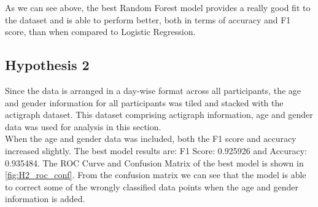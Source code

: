 \documentclass[11pt,a4paper]{article}
\newcommand{\noi}{\noindent}
\begin{document}
\noi
As we can see above, the best Random Forest model provides a really good fit to the dataset and is able to perform better, both in terms of accuracy and F1 score, than when compared to Logistic Regression.

\subsection{Hypothesis 2}
Since the data is arranged in a day-wise format across all participants, the age and gender information for all participants was tiled and stacked with the actigraph dataset. This dataset comprising actigraph information, age and gender data was used for analysis in this section.\\

\noi
When the age and gender data was included, both the F1 score and accuracy increased slightly. The best model results are: F1 Score: 0.925926 and Accuracy: 0.935484. The ROC Curve and Confusion Matrix of the best model is shown in \autoref{fig:H2_roc_conf}. From the confusion matrix we can see that the model is able to correct some of the wrongly classified data points when the age and gender information is added.
\end{document}
